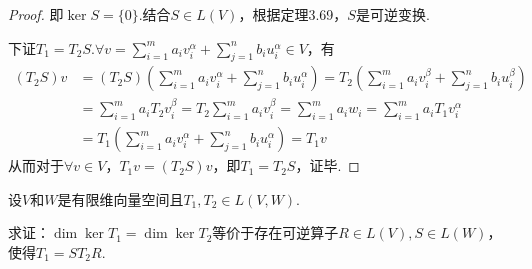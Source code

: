 \begin{proof}
    即\(\ker S=\{0\}\).结合\(S \in L(V)\)，根据定理3.69，\(S\)是可逆变换.
    
    下证\(T_1=T_2S\).\(\forall v=\sum_{i=1}^m a_iv_i^\alpha+\sum_{j=1}^n b_iu_i^\alpha \in V\)，有
    \begin{align*}
        (T_2S)v&=(T_2S)(\sum_{i=1}^m a_iv_i^\alpha+\sum_{j=1}^n b_iu_i^\alpha )
                =T_2(\sum_{i=1}^m a_iv_i^\beta+\sum_{j=1}^n b_iu_i^\beta ) \\
                &=\sum_{i=1}^m a_iT_2v_i^\beta=T_2\sum_{i=1}^m a_iv_i^\beta
                =\sum_{i=1}^m a_iw_i=\sum_{i=1}^m a_iT_1v_i^\alpha \\
                &=T_1(\sum_{i=1}^m a_iv_i^\alpha+\sum_{j=1}^n b_iu_i^\alpha)=T_1v
    \end{align*}
    从而对于\(\forall v \in V\)，\(T_1v=(T_2S)v\)，即\(T_1=T_2S\)，证毕.    
\end{proof}

\newpage

\begin{problem}[6]\label{3.D.6}
    设\(V\)和\(W\)是有限维向量空间且\(T_1,T_2 \in L(V,W)\).

    求证：\(\dim \ker T_1=\dim \ker T_2\)等价于存在可逆算子\(R \in L(V),S \in L(W)\)，使得\(T_1=ST_2R\).    
\end{problem}

